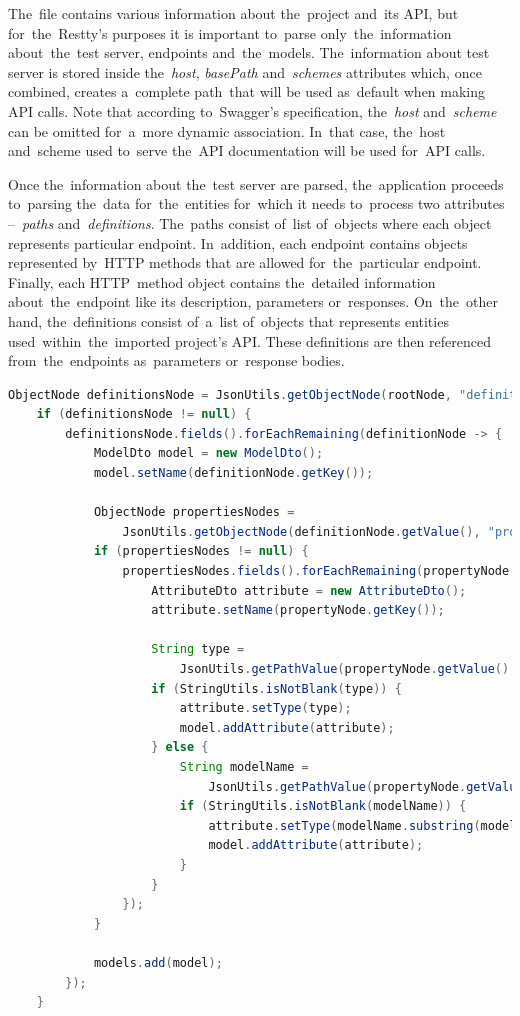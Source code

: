 The~file contains various information about the~project and~its API, but for~the~Restty's purposes it is important to~parse only~the~information
about~the~test server, endpoints and~the~models. The~information about test server is stored inside the~\textit{host}, \textit{basePath} and~\textit{schemes}
attributes which, once combined, creates a~complete path~that will be used as~default when making API calls. Note that according to~Swagger's specification,
the~\textit{host} and~\textit{scheme} can be omitted for~a~more dynamic association. In~that case, the~host and~scheme used to~serve the~API
documentation will be used for~API calls. 

Once the~information about the~test server are parsed, the~application proceeds to~parsing the~data for~the~entities for~which it needs to~process two
attributes --~\textit{paths} and~\textit{definitions}. The~paths consist of~list of~objects where each object represents particular endpoint. In~addition,
each endpoint contains objects represented by~HTTP methods that are allowed for~the~particular endpoint. Finally, each HTTP~method object contains the~detailed
information about~the~endpoint like its description, parameters or~responses. On~the~other hand, the~definitions consist of~a~list of~objects that represents
entities used~within~the~imported project's API. These definitions are then referenced from~the~endpoints as~parameters or~response bodies.

\vspace{1mm}
\begin{lstlisting}[caption=Parsing the~API's model definitions from~the~Swagger's API file.,
style=dp-default, language=Java]
ObjectNode definitionsNode = JsonUtils.getObjectNode(rootNode, "definitions", false);
	if (definitionsNode != null) {
		definitionsNode.fields().forEachRemaining(definitionNode -> {
			ModelDto model = new ModelDto();
			model.setName(definitionNode.getKey());
                
			ObjectNode propertiesNodes = 
				JsonUtils.getObjectNode(definitionNode.getValue(), "properties", false);
			if (propertiesNodes != null) {
				propertiesNodes.fields().forEachRemaining(propertyNode -> {
					AttributeDto attribute = new AttributeDto();
                    attribute.setName(propertyNode.getKey());

                    String type = 
                    	JsonUtils.getPathValue(propertyNode.getValue(), "type", false);
                    if (StringUtils.isNotBlank(type)) {
                    	attribute.setType(type);
                        model.addAttribute(attribute);
                   	} else {
                    	String modelName = 
                    		JsonUtils.getPathValue(propertyNode.getValue(), "ref", false);
                        if (StringUtils.isNotBlank(modelName)) {
                        	attribute.setType(modelName.substring(modelName.lastIndexOf('/') + 1));
                           	model.addAttribute(attribute);
                        }
                    }
            	});
            }

            models.add(model);
    	});
	}
\end{lstlisting}

